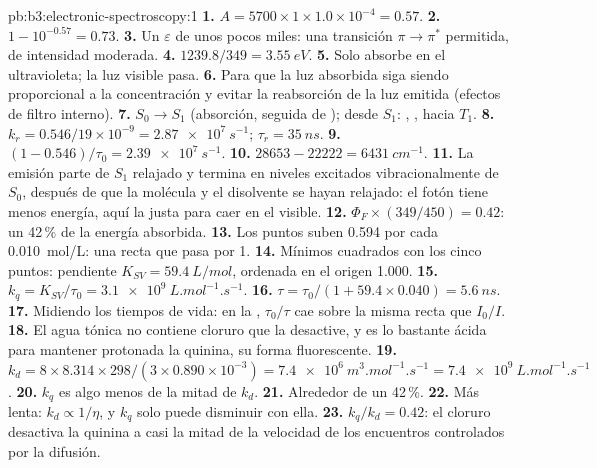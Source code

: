 \begin{solution}{pb:b3:electronic-spectroscopy:1}
\textbf{1.} $A = 5700 \times 1 \times 1.0\times10^{-4} = 0.57$.
\textbf{2.} $1 - 10^{-0.57} = 0.73$.
\textbf{3.} Un $\varepsilon$ de unos pocos miles: una transición $\pi\to\pi^*$ permitida, de intensidad
moderada.
\textbf{4.} $1239.8/349 = \qty{3.55}{eV}$.
\textbf{5.} Solo absorbe en el ultravioleta; la luz visible pasa.
\textbf{6.} Para que la luz absorbida siga siendo proporcional a la concentración y evitar la
reabsorción de la luz emitida (efectos de filtro interno).
\textbf{7.} $S_0 \to S_1$ (absorción, seguida de ); desde $S_1$:
, ,  hacia $T_1$.
\textbf{8.} $k_r = 0.546/19 \times 10^{-9} = \qty{2.87e7}{s^{-1}}$; $\tau_r = \qty{35}{ns}$.
\textbf{9.} $(1 - 0.546)/\tau_0 = \qty{2.39e7}{s^{-1}}$.
\textbf{10.} $28653 - 22222 = \qty{6431}{cm^{-1}}$.
\textbf{11.} La emisión parte de $S_1$ relajado y termina en niveles excitados vibracionalmente
de $S_0$, después de que la molécula y el disolvente se hayan relajado: el fotón tiene menos
energía, aquí la justa para caer en el visible.
\textbf{12.} $\Phi_F \times (349/450) = 0.42$: un 42\,\% de la energía absorbida.
\textbf{13.} Los puntos suben 0.594 por cada \qty{0.010}{mol/L}: una recta que pasa por 1.
\textbf{14.} Mínimos cuadrados con los cinco puntos: pendiente $K_{SV} = \qty{59.4}{L/mol}$,
ordenada en el origen 1.000.
\textbf{15.} $k_q = K_{SV}/\tau_0 = \qty{3.1e9}{L.mol^{-1}.s^{-1}}$.
\textbf{16.} $\tau = \tau_0/(1 + 59.4 \times 0.040) = \qty{5.6}{ns}$.
\textbf{17.} Midiendo los tiempos de vida: en la , $\tau_0/\tau$ cae sobre la misma recta
que $I_0/I$.
\textbf{18.} El agua tónica no contiene cloruro que la desactive, y es lo bastante ácida para
mantener protonada la quinina, su forma fluorescente.
\textbf{19.} $k_d = 8 \times 8.314 \times 298/(3 \times 0.890\times10^{-3}) =
\qty{7.4e6}{m^3.mol^{-1}.s^{-1}} = \qty{7.4e9}{L.mol^{-1}.s^{-1}}$.
\textbf{20.} $k_q$ es algo menos de la mitad de $k_d$.
\textbf{21.} Alrededor de un 42\,\%.
\textbf{22.} Más lenta: $k_d \propto 1/\eta$, y $k_q$ solo puede disminuir con ella.
\textbf{23.} \textbf{$k_q/k_d = 0.42$}: el cloruro desactiva la quinina a casi la mitad de la
velocidad de los encuentros controlados por la difusión.
\end{solution}
